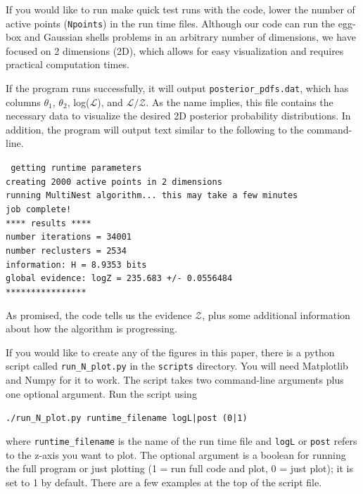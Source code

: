 \documentclass{article}
\begin{document}
\noindent If you would like to run make quick test runs with the code, lower the number of active points ({\tt Npoints}) in the run time files. Although our code can run the egg-box and Gaussian shells problems in an arbitrary number of dimensions, we have focused on 2 dimensions (2D), which allows for easy visualization and requires practical computation times. 

If the program runs successfully, it will output {\tt posterior\_pdfs.dat}, which has columns  $\theta_1$, $\theta_2$, log($\mathcal{L}$), and $\mathcal{L/Z}$. As the name implies, this file contains the necessary data to visualize the desired 2D posterior probability distributions. In addition, the program will output text similar to the following to the command-line. 

\begin{adjustwidth*}{1.2cm}{1.2cm}
{\tt
getting runtime parameters\\
creating 2000 active points in 2 dimensions\\
running MultiNest algorithm... this may take a few minutes\\
job complete!\\
**** results ****\\
number iterations = 34001\\
number reclusters = 2534\\
information: H =  8.9353 bits\\
global evidence: logZ = 235.683 +/- 0.0556484\\
****************}
\end{adjustwidth*}

As promised, the code tells us the evidence $\mathcal{Z}$, plus some additional information about how the algorithm is progressing. 

If you would like to create any of the figures in this paper, there is a python script called {\tt run\_N\_plot.py} in the {\tt scripts} directory. You will need Matplotlib and Numpy for it to work. The script takes two command-line arguments plus one optional argument. Run the script using 

\vspace{0.2cm}

\begin{adjustwidth*}{2cm}{2cm}
{\tt ./run\_N\_plot.py runtime\_filename logL|post (0|1)}
\end{adjustwidth*}

\vspace{0.2cm}

\noindent where {\tt runtime\_filename} is the name of the run time file and {\tt logL} or {\tt post} refers to the z-axis you want to plot. The optional argument is a boolean for running the full program or just plotting (1 = run full code and plot, 0 = just plot); it is set to 1 by default. There are a few examples at the top of the script file. 

\vspace{-0.3cm}



\end{document}
